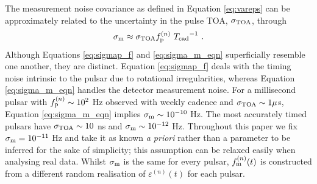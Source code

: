 \documentclass[fleqn,usenatbib,useAMS]{mnras}
\begin{document}
The measurement noise covariance as defined in Equation \eqref{eq:vareps} can be approximately related to the uncertainty in the pulse TOA, $\sigma_{\rm TOA}$, through
\begin{equation}
	\sigma_{\rm m} \approx \sigma_{\rm TOA} f_{\rm p}^{(n)}  \ {T_{\rm cad}}^{-1} \ . \label{eq:sigma_m_eqn}
\end{equation}
Although Equations \eqref{eq:sigmap_f} and \eqref{eq:sigma_m_eqn} superficially resemble one another, they are distinct. Equation \eqref{eq:sigmap_f} deals with the timing noise intrinsic to the pulsar due to rotational irregularities, whereas Equation \eqref{eq:sigma_m_eqn} handles the detector measurement noise. For a millisecond pulsar with $f_{\rm p}^{(n)} \sim 10^2$ Hz observed with weekly cadence and $\sigma_{\rm TOA} \sim 1 \mu$s, Equation \eqref{eq:sigma_m_eqn} implies $\sigma_{\rm m} \sim 10^{-10}$ Hz. The most accurately timed pulsars have $\sigma_{\rm TOA} \sim 10 $ ns and $\sigma_{\rm m} \sim 10^{-12}$ Hz. Throughout this paper we fix $\sigma_{\rm m} = 10^{-11}$ Hz and take it as known \textit{a priori} rather than a parameter to be inferred for the sake of simplicity; this assumption can be relaxed easily when analysing real data. Whilst $\sigma_{\rm m}$ is the same for every pulsar, $f_{\rm m} ^{(n)}(t)$ is constructed from a different random realisation of $\varepsilon^{(n)}(t)$ for each pulsar. \newline 
\end{document}
